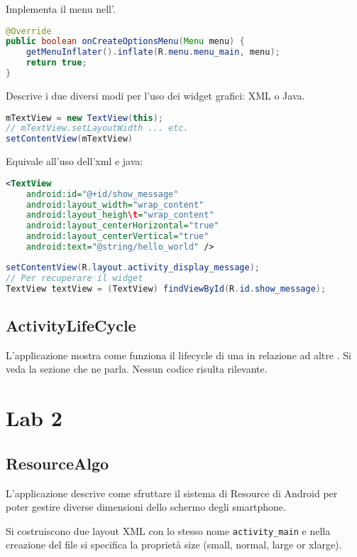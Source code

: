 Implementa il menu nell'\Activity.
\begin{lstlisting}[language=Java]
@Override
public boolean onCreateOptionsMenu(Menu menu) {
	getMenuInflater().inflate(R.menu.menu_main, menu);
	return true;
}
\end{lstlisting}


Descrive i due diversi modi per l'uso dei widget grafici: XML o Java.
\begin{lstlisting}[language=Java]
mTextView = new TextView(this);
// mTextView.setLayoutWidth ... etc.
setContentView(mTextView)
\end{lstlisting}

Equivale all'uso dell'xml e java:

\begin{lstlisting}[language=XML]
<TextView
	android:id="@+id/show_message"
	android:layout_width="wrap_content"
	android:layout_heigh\t="wrap_content"
	android:layout_centerHorizontal="true"
	android:layout_centerVertical="true"
	android:text="@string/hello_world" />
\end{lstlisting}
\begin{lstlisting}[language=Java]
setContentView(R.layout.activity_display_message);
// Per recuperare il widget
TextView textView = (TextView) findViewById(R.id.show_message);
\end{lstlisting}

\subsection{ActivityLifeCycle}
L'applicazione mostra come funziona il lifecycle di una \Activity in relazione ad altre \Activity. Si veda la sezione che ne parla. Nessun codice risulta rilevante.


\section{Lab 2}

\subsection{ResourceAlgo}
L'applicazione descrive come sfruttare il sistema di Resource di Android per poter gestire diverse dimensioni dello schermo degli smartphone.

Si costruiscono due layout XML con lo stesso nome \lstinline|activity_main| e nella creazione del file si specifica la proprietà size (small, normal, large or xlarge).

